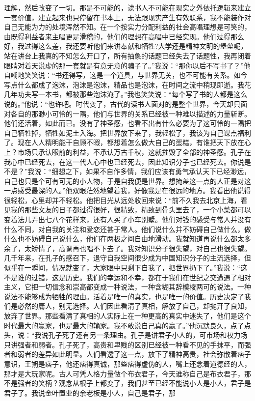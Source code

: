 \documentclass[12pt,oneside]{book}
\begin{document}
理解，然后改变了一切。那是不可能的，读书人不可能在现实之外依托逻辑来建立一套价值，建立起来也只停留在书本上，无法跟现实产生有效联系，我不能装作对自己无能为力的处境浑然不知。在一个按实力分配利益的社会高唱理想是可笑的，由既得利益者来主唱更是滑稽的，他们的理想在高唱中已经实现。他们过得那么好，我过得这么差，我还要听他们来讲奉献和牺牲?大学还是精神文明的堡垒呢，站在讲台上我真的不知怎么开口了，所有抽象的话题已经失去了话题性，我再闭着眼睛对着天说虚的那一套就是有意无意的骗子了。''我说：``那你以后不写书了？''他自嘲地笑笑说：``书还得写，这是一个道具，与世界无关，也不可能有关系。如今写点什么都成了泡沫，泡沫是泡沫，精品也是泡沫，在时间之流中稍现即逝。我花几年功夫写一本书，都被那些泡沫淹了。''我也笑笑说：``每个写了书的人都是这么说的。''他说：``也许吧。时代变了，古代的读书人面对的是整个世界，今天却只面对各自的那渺小可怜的一隅，他们与世界的关系已经被一种难以描述的力量斩断。他们还活着，如此而已。没有了神圣感，也看不出有什么必要为了这可怜的一隅把自己牺牲掉，牺牲如泥土入海。把世界放下来了，我轻松了，我该为自己谋点福利了。现在人人精明能干自顾不暇，都想着怎么做大自己的蛋糕，有谁把天下放在心上？市场只承认眼前的利益，不承认万古千秋，这就摧毁了全部的神圣感。孔子在我心中已经死去，在这一代人心中也已经死去，因此知识分子也已经死去。你说是不是？''我说：``细想之下，如果不自作多情，我们应该有勇气承认天下已经渺远，自己也只是个可有可无的小人物，于是自我便是世界。想掩盖这一点的人正是对这一点感受最深的人。''他双眼茫然地望着我，好像我是在很远的地方。我看出他说得很轻松，心里却并不轻松。他把目光从远处收回来说：``前不久我去北京上海，看见我的那些文友的日子都过得很好，很精致，精致到骨头里去了，一个小菜都可以变着法儿弄出七八个花样来，还有人买了小车别墅。他们对钱的感受与常人并没有什么不同，对自我的关注和爱恋还甚于常人。他们说什么并不妨碍自己做什么，做什么也不妨碍自己说什么，他们在两极之间自由地滑动。我就知道再说什么都太多余了，太矫情了，高调再也唱不下去了。我对知识分子很失望，对自己也很失望。几千年来，在孔子的感召下，退守自我空间很少成为中国知识分子的主流选择，但似乎在一瞬间，情况就变了，大家眼中只剩下自我了，把世界扔下了。''我说：``这不是谁的过错，这是历史。我们的幸运和不幸，都在于我们在世纪之交遭遇了相对主义，它把一切信念和崇高都变成一种说法，一种含糊其辞模棱两可的说法。一种说法不能够成为牺牲的理由。活着是唯一的真实，也是唯一的价值。历史决定了我们是必然的庸人，别无选择。人们因此看清了真相，解放了自己，却抛开了良知，放弃了世界。那些看清了真相的人实际上在一种更高的真实中迷失了，他们是这个时代最大的赢家，也是最大的输家。我不敢说自己真的赢了。''他沉默良久，点了点头，说：``我说孔子死了还有另一条理由。孔子是讲君子小人的，可市场和权力场只讲强者和弱者。孔子死了，高贵和卑贱的区别已经被一种看不见的手抹平，而强者和弱者的差异如此明显。人们看透了这一点，放下了精神高贵，社会弥散着痞子意识，王朔是痞子，他还痞得真诚，那些痞得虚伪的人，嘴上还念着道德经的人，那才是大玩家呢。古人可凭人格力量做个布衣君子，今天谁称自己是布衣君子，那不是强者的笑柄？观念从根子上都变了，我们甚至已经不能说小人是小人，君子是君子了。我说金叶置业的余老板是小人，自己是君子，那
\end{document}
